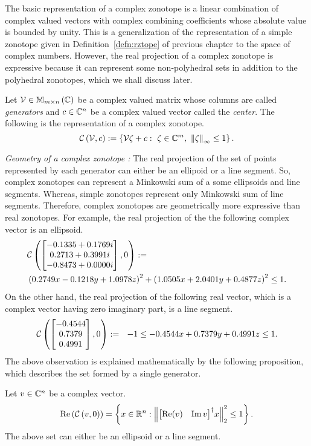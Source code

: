 The basic representation of a complex zonotope is a linear combination
of complex valued vectors with complex combining coefficients whose
absolute value is bounded by unity.  This is a generalization of the
representation of a simple zonotope given in Definition~\ref{defn:rztope} of
previous chapter to the space of complex numbers.  However, the real
projection of a complex zonotope is expressive because it can
represent some non-polyhedral sets in addition to the polyhedral
zonotopes, which we shall discuss later.
%
\begin{definition}
Let $\mathcal{V}\in\mathbb{M}_{m\times n}\left(\mathbb{C}\right)$ be a complex valued matrix
whose columns are called {\it generators} and $c\in\mathbb{C}^n$ be a
complex valued vector called the {\it center}.  The following is the
representation of a
complex zonotope.
%
\begin{equation}
\mathit{\mathcal{C}}\left(\mathcal{V},c\right) := \left\{\mathcal{V}\zeta+c:~\zeta\in\mathbb{C}^m,~\left\|\zeta\right\|_{\infty}\leq 1\right\}.
\end{equation}
%
\end{definition}
%
{\it Geometry of a complex zonotope :}
The real projection of the set of points represented by each generator
can either be an ellipoid or a line segment.  So, complex
zonotopes can represent a Minkowski sum of a some ellipsoids and line
segments.  Whereas, simple zonotopes represent only Minkowski sum of
line segments.  Therefore, complex zonotopes are geometrically more
expressive than real zonotopes.
For example, the real projection of the the following complex vector
is an ellipsoid.
%
\begin{align*}
& \mathit{\mathcal{C}}\left(\left[\begin{matrix}-0.1335 + 0.1769i\\0.2713 + 0.3991i\\-0.8473 + 0.0000i\end{matrix}\right],0\right):=~~\\
&  \left(0.2749x-0.1218y+1.0978z\right)^2+\left(1.0505x+2.0401y+0.4877z\right)^2\leq 1.
\end{align*}
%
On the other hand, the real projection of the following real vector, which is a
complex vector having zero imaginary part, is a line segment.
%
\begin{align*}
\mathit{\mathcal{C}}\left(\left[\begin{matrix}-0.4544\\
    0.7379\\
    0.4991\end{matrix}\right],0\right):=~~-1\leq -0.4544x+0.7379y+0.4991z\leq 1.
\end{align*}
%
The above observation is explained mathematically by the following
proposition, which describes the set formed by a single generator.  
%
\begin{proposition}
Let $v\in\mathbb{C}^n$ be a complex vector.  
%
\[
\operatorname{Re}\left(\mathit{\mathcal{C}}\left(v,0\right)\right)=\left\{x\in\mathbb{R}^n:\left\|{\left[\begin{matrix}\operatorname{Re}(v)&\operatorname{Im}{v}\end{matrix}\right]}^\dagger x\right\|_2^2\leq
1\right\}.
\]
%
The above set can either be an ellipsoid or a line segment.
\end{proposition}
